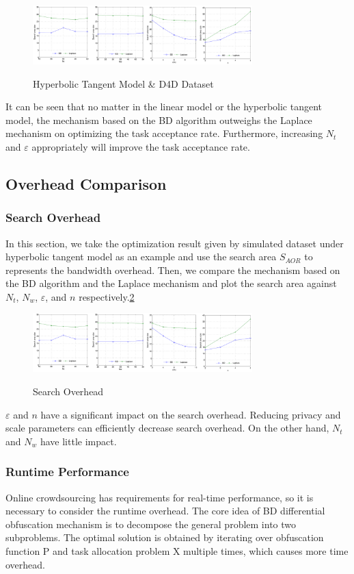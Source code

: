 \begin{figure}
\includegraphics[width=8.5cm]{TanhD4D}
\label{img:TanhD4D}
\caption{Hyperbolic Tangent Model \& D4D Dataset}
\end{figure}

It can be seen that no matter in the linear model or the hyperbolic tangent model, the mechanism based on the BD algorithm outweighs the Laplace mechanism on optimizing the task acceptance rate. Furthermore, increasing $N_t$ and $\varepsilon$ appropriately will improve the task acceptance rate.

\subsection{Overhead Comparison}
\subsubsection{Search Overhead}
In this section, we take the optimization result given by simulated dataset under hyperbolic tangent model as an example and use the search area $S_{AOR}$ to represents the bandwidth overhead. Then, we compare the mechanism based on the BD algorithm and the Laplace mechanism and plot the search area against $N_t$, $N_w$, $\varepsilon$, and $n$ respectively.\ref{img:SAOR}

\begin{figure}
\includegraphics[width=8.5cm]{SAOR}
\label{img:SAOR}
\caption{Search Overhead}
\end{figure}

$\varepsilon$ and $n$ have a significant impact on the search overhead. Reducing privacy and scale parameters can efficiently decrease search overhead. On the other hand, $N_t$ and $N_w$ have little impact.

\subsubsection{Runtime Performance}
Online crowdsourcing has requirements for real-time performance, so it is necessary to consider the runtime overhead. The core idea of BD differential obfuscation mechanism is to decompose the general problem into two subproblems. The optimal solution is obtained by iterating over obfuscation function P and task allocation problem X multiple times, which causes more time overhead.

